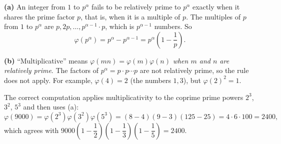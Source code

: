 \textbf{(a)} An integer from $1$ to $p^\alpha$ fails to be relatively prime to $p^\alpha$ exactly when it shares the prime factor $p$, that is, when it is a multiple of $p$. The multiples of $p$ from $1$ to $p^\alpha$ are $p,2p,\dots,p^{\alpha-1}\cdot p$, which is $p^{\alpha-1}$ numbers. So
\[\varphi\left(p^\alpha\right)=p^\alpha-p^{\alpha-1}=p^\alpha\left(1-\dfrac{1}{p}\right).\]

\textbf{(b)} ``Multiplicative'' means $\varphi(mn)=\varphi(m)\varphi(n)$ \emph{when $m$ and $n$ are relatively prime}. The factors of $p^\alpha=p\cdot p\cdots p$ are not relatively prime, so the rule does not apply. For example, $\varphi(4)=2$ (the numbers $1,3$), but $\varphi(2)^2=1$.

The correct computation applies multiplicativity to the coprime prime powers $2^3$, $3^2$, $5^3$ and then uses (a):
\[\varphi(9000)=\varphi\left(2^3\right)\varphi\left(3^2\right)\varphi\left(5^3\right)=(8-4)(9-3)(125-25)=4\cdot6\cdot100=\boxed{2400},\]
which agrees with $9000\left(1-\dfrac{1}{2}\right)\left(1-\dfrac{1}{3}\right)\left(1-\dfrac{1}{5}\right)=2400$.
